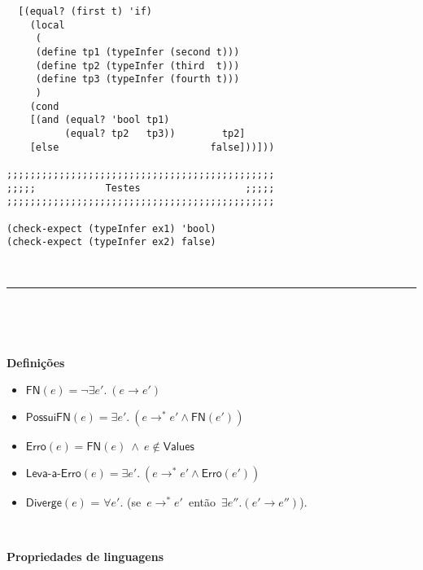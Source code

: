 \documentclass[10pt,a4paper]{article}
\begin{document}
\begin{multicols}{2}
\begin{verbatim}
  [(equal? (first t) 'if) 
    (local 
     ( 
     (define tp1 (typeInfer (second t)))
     (define tp2 (typeInfer (third  t))) 
     (define tp3 (typeInfer (fourth t)))
     )
    (cond 
    [(and (equal? 'bool tp1) 
          (equal? tp2   tp3))        tp2]
    [else                          false]))])) 

;;;;;;;;;;;;;;;;;;;;;;;;;;;;;;;;;;;;;;;;;;;;;; 
;;;;;            Testes                  ;;;;;
;;;;;;;;;;;;;;;;;;;;;;;;;;;;;;;;;;;;;;;;;;;;;;

(check-expect (typeInfer ex1) 'bool)
(check-expect (typeInfer ex2) false)
\end{verbatim}

\end{multicols}



\ 

\hrule 


\ 

\ 



\noindent \textbf{Definições}


\begin{itemize}
    \item $\textsf{FN}(e) = \neg \exists e'.\ (e \longrightarrow e')$
    \item $\textsf{PossuiFN}(e) = \exists e'.\ (e \longrightarrow^* e' \land \textsf{FN}(e'))$
    \item $\textsf{Erro}(e) = \textsf{FN}(e)\ \land\ e \not\in \textsf{Values}$
    \item $\textsf{Leva-a-Erro}(e) = \exists e'.\ (e \longrightarrow^* e' \land \textsf{Erro}(e'))$
    \item $\textsf{Diverge}(e)$ = $\forall e'.$ (se\ $e \longrightarrow^* e'$\ então\ $\exists e''.(e' \longrightarrow e'')$). 
\end{itemize}



\ 


\noindent \textbf{Propriedades de linguagens}
\end{document}
